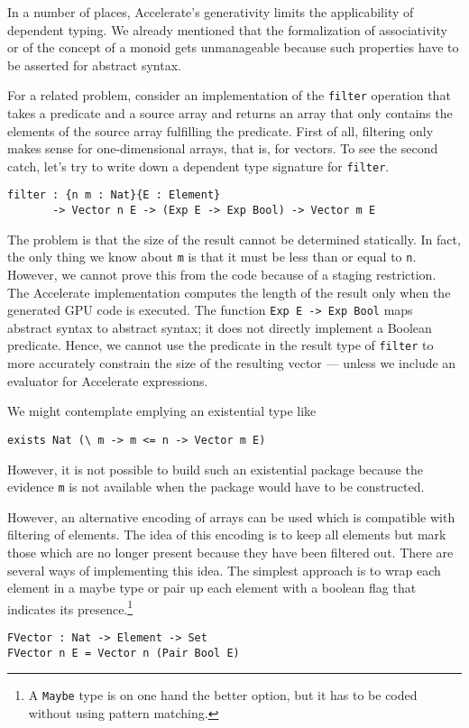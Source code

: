 \documentclass{llncs}
\begin{document}
In a number of places, Accelerate's generativity limits the
applicability of dependent typing. We already mentioned that the
formalization of associativity or of the concept of a monoid gets
unmanageable because such properties have to be asserted for abstract syntax.

For a related problem, consider an implementation of the \texttt{filter}
operation that takes a predicate and a source array and returns an
array that only contains the elements of the source array fulfilling
the predicate.  First of all, filtering only makes sense for
one-dimensional arrays, that is, for vectors. To see the second catch,
let's try to write down a dependent type signature for \texttt{filter}.
\begin{verbatim}
filter : {n m : Nat}{E : Element}
       -> Vector n E -> (Exp E -> Exp Bool) -> Vector m E
\end{verbatim}
The problem is that the size of the result
cannot be determined statically. In fact, the only thing we know about
\texttt{m} is that it must be less than or equal to
\texttt{n}. However, we cannot prove this from the code because of a staging restriction. The Accelerate implementation computes the length of the result only when the generated GPU code is executed. The function \texttt{Exp E -> Exp Bool} maps abstract syntax to abstract syntax; it does not directly implement a Boolean predicate. Hence, we cannot use the predicate in the result type of \texttt{filter} to more accurately constrain the size of the resulting vector --- unless we include an evaluator for Accelerate expressions. 

We might contemplate emplying an existential type like
\begin{verbatim}
exists Nat (\ m -> m <= n -> Vector m E)
\end{verbatim}
However, it is not possible to build such an
existential package because the evidence \texttt{m} is not available
when the package would have to be constructed.

However, an alternative encoding of arrays can be
used which is compatible with filtering of elements. The idea of this
encoding is to keep all elements but mark those which are no longer
present because they have been filtered out.
There are several ways of implementing this idea. The simplest
approach is to wrap each element in a maybe type or
pair up each element with a boolean flag that indicates
its presence.\footnote{A \texttt{Maybe} type is on one hand the better option,
  but it has to be coded without using pattern matching.}
\begin{verbatim}
FVector : Nat -> Element -> Set
FVector n E = Vector n (Pair Bool E)
\end{verbatim}
\end{document}
